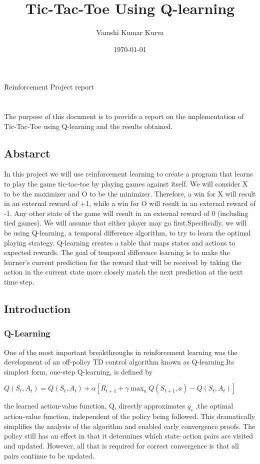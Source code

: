 \documentclass[a4paper, 12pt, notitlepage]{report}
\title{Tic-Tac-Toe Using Q-learning} %
\author{Vamshi Kumar Kurva} %
\date{\today} %
\begin{document}
\maketitle
\begin{center}
Reinforcement Project report %
\\[12pt]
\end{center}
\tableofcontents 


\chapter{}
%
The purpose of this document is to provide a report on the implementation of Tic-Tac-Toe using Q-learning and the results obtained. 

\section{Abstarct}
%
In this project we will use reinforcement learning to create a program that learns to play the game tic-tac-toe by playing games against itself. We will consider X to be the maximizer and O to be the minimizer. Therefore, a win for X will result in an external reward of +1, while a win for O will result in an external reward of -1. Any other state of the game will result in an external reward of 0 (including tied games).
We will assume that either player may go first.Specifically, we will be using Q-learning, a temporal difference algorithm, to try to learn the optimal playing strategy. Q-learning creates a table that maps states and actions to expected rewards. The goal of temporal difference learning is to make the
learner's current prediction for the reward that will be received by taking the action in the current state more closely match the next prediction at the next time step.

\section{Introduction}
%
\subsection{Q-Learning}
One of the most important breakthroughs in reinforcement learning was the development of an off-policy TD control algorithm known as Q-learning.Its simplest form, one-step Q-learning, is defined by
\begin{center}
$ Q(S_t,A_t) = Q(S_t,A_t)+\alpha[R_{t+1}+ \gamma \max_{a} Q(S_{t+1},a)-Q(S_t,A_t)] $
\end{center}
the learned action-value function, Q, directly approximates $q_∗$ ,the optimal action-value function, independent of the policy being followed.
This dramatically simplifies the analysis of the algorithm and enabled early convergence proofs. The policy still has an effect in that it determines which state–action pairs are visited and updated. However, all that is required for correct convergence is that all pairs continue to be updated.
\end{document}
